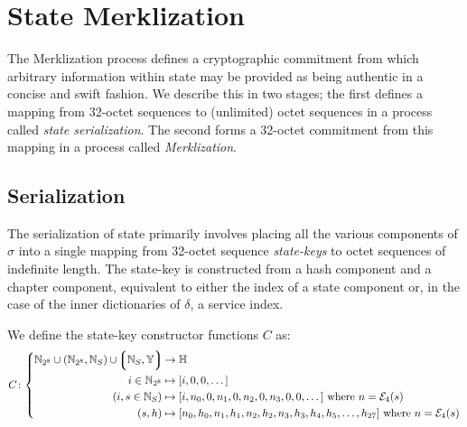 \section{State Merklization}\label{sec:statemerklization}

The Merklization process defines a cryptographic commitment from which arbitrary information within state may be provided as being authentic in a concise and swift fashion. We describe this in two stages; the first defines a mapping from 32-octet sequences to (unlimited) octet sequences in a process called \emph{state serialization}. The second forms a 32-octet commitment from this mapping in a process called \emph{Merklization}.

\subsection{Serialization}

The serialization of state primarily involves placing all the various components of $\sigma$ into a single mapping from 32-octet sequence \emph{state-keys} to octet sequences of indefinite length. The state-key is constructed from a hash component and a chapter component, equivalent to either the index of a state component or, in the case of the inner dictionaries of $\delta$, a service index.

We define the state-key constructor functions $C$ as:
\begin{equation}
  C\colon\left\{\begin{aligned}
    \N_{2^8} \cup (\N_{2^8}, \N_S) \cup \tup{\N_S, \Y} &\to \H \\
    i \in \N_{2^8} &\mapsto [i, 0, 0, \dots] \\
    (i, s \in \N_S) &\mapsto [i, n_0, 0, n_1, 0, n_2, 0, n_3, 0, 0, \dots]\ \where n = \se_4(s) \\
    (s, h) &\mapsto [n_0, h_0, n_1, h_1, n_2, h_2, n_3, h_3, h_4, h_5, \dots, h_{27}]\ \where n = \se_4(s)
  \end{aligned}
  \right.
\end{equation}


